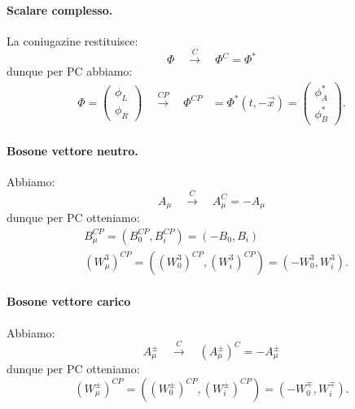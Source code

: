 \paragraph{Scalare complesso.}La coniugazine restituisce:
\begin{equation}
    \Phi \quad \overset{C}{\longrightarrow}\quad \Phi^C = \Phi^*
\end{equation}
dunque per PC abbiamo:
\begin{align}
    \Phi = \begin{pmatrix}
        \phi_L \\
        \phi_R
    \end{pmatrix} \quad \overset{CP}{\longrightarrow}\quad \Phi^{CP} &= \Phi^*(t,-\vec{x}) = \begin{pmatrix}
        \phi_A^* \\
        \phi_B^*
    \end{pmatrix}.
\end{align}

\paragraph{Bosone vettore neutro.}Abbiamo:
\begin{equation}
    A_\mu \quad \overset{C}{\longrightarrow}\quad A_\mu^C = -A_\mu
\end{equation}
dunque per PC otteniamo:
\begin{align}
    &B_{\mu}^{CP} = (B_0^{CP},B_i^{CP}) = (-B_0,B_i) \\
    &(W_\mu^3)^{CP} = \left( (W_0^3)^{CP}, (W_i^3)^{CP} \right) = (-W_0^3,W_i^3).
\end{align}

\paragraph{Bosone vettore carico}Abbiamo:
\begin{equation}
    A_\mu^\pm \quad \overset{C}{\longrightarrow}\quad (A_\mu^\pm)^C = -A_\mu^\pm
\end{equation}
dunque per PC otteniamo:
\begin{equation}
    (W_\mu^\pm)^{CP} = \left( (W_0^\pm)^{CP}, (W_i^\pm)^{CP} \right) = (-W_0^\mp,W_i^\mp).
\end{equation}

